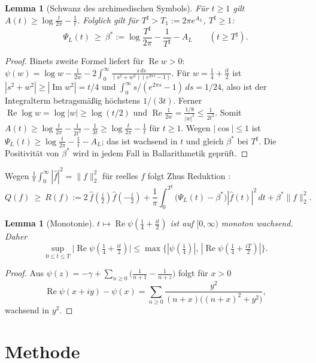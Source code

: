 \documentclass[11pt,a4paper]{article}
\newtheorem{lemma}[theorem]{Lemma}
\theoremstyle{definition}
\renewcommand{\Re}{\operatorname{Re}}
\renewcommand{\Im}{\operatorname{Im}}
\begin{document}
\begin{lemma}[Schwanz des archimedischen Symbols]\label{lem:binet}
Für $t\ge1$ gilt $A(t)\ge\log\frac t{2\pi}-\frac1t$. Folglich gilt für $T^\sharp>T_1:=2\pi e^{A_L}$, $T^\sharp\ge1$:
\[
\Psi_L(t)\ \ge\ \beta^*:=\log\frac{T^\sharp}{2\pi}-\frac1{T^\sharp}-A_L\qquad (t\ge T^\sharp).
\]
\end{lemma}
\begin{proof}
Binets zweite Formel liefert für $\Re w>0$: $\psi(w)=\log w-\frac1{2w}-2\int_0^\infty\frac{s\,ds}{(s^2+w^2)(e^{2\pi s}-1)}$. Für $w=\frac14+\frac{it}2$ ist $|s^2+w^2|\ge|\Im w^2|=t/4$ und $\int_0^\infty s/(e^{2\pi s}-1)\,ds=1/24$, also ist der Integralterm betragsmäßig höchstens $1/(3t)$. Ferner $\Re\log w=\log|w|\ge\log(t/2)$ und $\Re\frac1{2w}=\frac{1/8}{|w|^2}\le\frac1{2t^2}$. Somit $A(t)\ge\log\frac t{2\pi}-\frac1{2t^2}-\frac1{3t}\ge\log\frac t{2\pi}-\frac1t$ für $t\ge1$. Wegen $|\cos|\le1$ ist $\Psi_L(t)\ge\log\frac t{2\pi}-\frac1t-A_L$; das ist wachsend in $t$ und gleich $\beta^*$ bei $T^\sharp$. Die Positivität von $\beta^*$ wird in jedem Fall in Ballarithmetik geprüft.
\end{proof}

Wegen $\frac1\pi\int_0^\infty|\hat f|^2=\|f\|_2^2$ für reelles $f$ folgt Zhus Reduktion \cite{Zhu26}:
\begin{equation}\label{eq:R}
Q(f)\ \ge\ R(f):=2\,\hat f(\tfrac i2)\hat f(-\tfrac i2)+\frac1\pi\int_0^{T^\sharp}\bigl(\Psi_L(t)-\beta^*\bigr)|\hat f(t)|^2\,dt+\beta^*\|f\|_2^2 .
\end{equation}

\begin{lemma}[Monotonie]\label{lem:mono}
$t\mapsto\Re\psi(\frac14+\frac{it}2)$ ist auf $[0,\infty)$ monoton wachsend. Daher
\[\sup_{0\le t\le T}\bigl|\Re\psi(\tfrac14+\tfrac{it}2)\bigr|\le\max\bigl\{|\psi(\tfrac14)|,\,|\Re\psi(\tfrac14+\tfrac{iT}2)|\bigr\}.\]
\end{lemma}
\begin{proof}
Aus $\psi(z)=-\gamma+\sum_{n\ge0}\bigl(\frac1{n+1}-\frac1{n+z}\bigr)$ folgt für $x>0$
\[\Re\psi(x+iy)-\psi(x)=\sum_{n\ge0}\frac{y^2}{(n+x)\bigl((n+x)^2+y^2\bigr)},\]
wachsend in $y^2$.
\end{proof}

\section{Methode}\label{sec:method}
\end{document}

